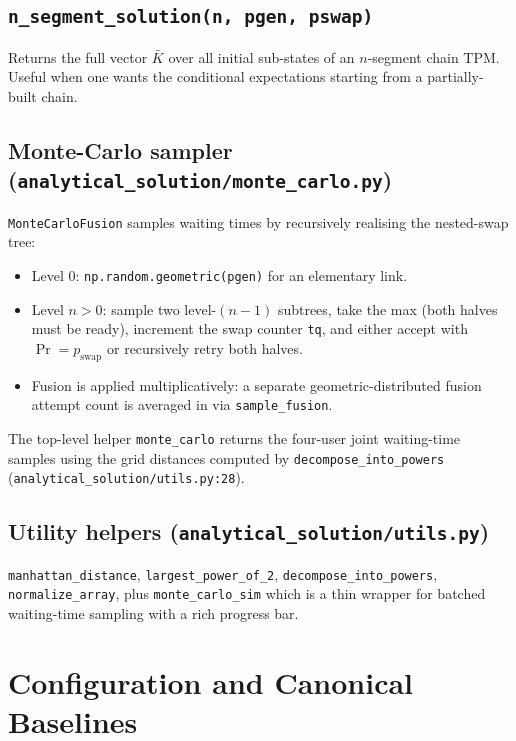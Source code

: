 \documentclass[11pt]{article}
\newcommand{\code}[1]{\texttt{#1}}
\newcommand{\file}[1]{\texttt{\small #1}}
\newcommand{\pswap}{p_{\text{swap}}}
\begin{document}
\subsection{\code{n\_segment\_solution(n, pgen, pswap)}}
Returns the full vector $\bar K$ over all initial sub-states of an $n$-segment chain TPM. Useful when one wants the conditional expectations starting from a partially-built chain.

\subsection{Monte-Carlo sampler (\file{analytical\_solution/monte\_carlo.py})}
\code{MonteCarloFusion} samples waiting times by recursively realising the nested-swap tree:
\begin{itemize}
  \item Level 0: \code{np.random.geometric(pgen)} for an elementary link.
  \item Level $n>0$: sample two level-$(n-1)$ subtrees, take the max (both halves must be ready), increment the swap counter \code{tq}, and either accept with $\Pr=\pswap$ or recursively retry both halves.
  \item Fusion is applied multiplicatively: a separate geometric-distributed fusion attempt count is averaged in via \code{sample\_fusion}.
\end{itemize}
The top-level helper \code{monte\_carlo} returns the four-user joint waiting-time samples using the grid distances computed by \code{decompose\_into\_powers} (\file{analytical\_solution/utils.py:28}).

\subsection{Utility helpers (\file{analytical\_solution/utils.py})}
\code{manhattan\_distance}, \code{largest\_power\_of\_2}, \code{decompose\_into\_powers}, \code{normalize\_array}, plus \code{monte\_carlo\_sim} which is a thin wrapper for batched waiting-time sampling with a rich progress bar.

\section{Configuration and Canonical Baselines}
\label{sec:config}
\end{document}
